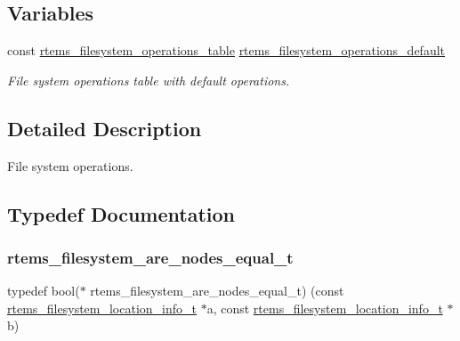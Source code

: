 \subsection*{Variables}
\begin{DoxyCompactItemize}
\item 
\mbox{\label{group__LibIOFSOps_gad7ee501951b5067cb6cdf2abe4c1125d}} 
const \mbox{\hyperlink{struct__rtems__filesystem__operations__table}{rtems\+\_\+filesystem\+\_\+operations\+\_\+table}} \mbox{\hyperlink{group__LibIOFSOps_gad7ee501951b5067cb6cdf2abe4c1125d}{rtems\+\_\+filesystem\+\_\+operations\+\_\+default}}
\begin{DoxyCompactList}\small\item\em File system operations table with default operations. \end{DoxyCompactList}\end{DoxyCompactItemize}


\subsection{Detailed Description}
File system operations. 



\subsection{Typedef Documentation}
\mbox{\label{group__LibIOFSOps_ga97ac953981e738d086a678a2cb66105d}} 
\subsubsection{\texorpdfstring{rtems\_filesystem\_are\_nodes\_equal\_t}{rtems\_filesystem\_are\_nodes\_equal\_t}}
{\footnotesize\ttfamily typedef bool($\ast$ rtems\+\_\+filesystem\+\_\+are\+\_\+nodes\+\_\+equal\+\_\+t) (const \mbox{\hyperlink{group__LibIO_ga3252b3d31ee3c49ffff0b7604a676864}{rtems\+\_\+filesystem\+\_\+location\+\_\+info\+\_\+t}} $\ast$a, const \mbox{\hyperlink{group__LibIO_ga3252b3d31ee3c49ffff0b7604a676864}{rtems\+\_\+filesystem\+\_\+location\+\_\+info\+\_\+t}} $\ast$b)}



